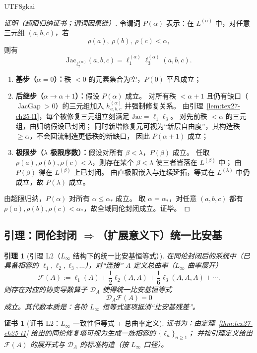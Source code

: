 \documentclass[12pt]{article}
\newtheorem{lemma}{引理}[section]
\newtheorem{Certificate}{证书}[section]
\newcommand{\JacGap}{\operatorname{JacGap}}
\begin{document}
\begin{CJK*}{UTF8}{gkai}
\begin{proof}[证明（超限归纳证书；谓词因果链）]
令谓词 $P(\alpha)$ 表示：在 $L^{(\alpha)}$ 中，对任意三元组 $(a,b,c)$，若
\[
  \rho(a),\ \rho(b),\ \rho(c)<\alpha,
\]
则有
\[
  \mathrm{Jac}_{\ell_2^{(\alpha)}}(a,b,c)=\ell_1^{(\alpha)}\ell_3^{(\alpha)}(a,b,c).
\]
\begin{enumerate}
  \item \textbf{基步（$\alpha=0$）：}秩 $<0$ 的元素集合为空，$P(0)$ 平凡成立；
  \item \textbf{后继步（$\alpha\to\alpha+1$）：}假设 $P(\alpha)$ 成立。
  对所有秩 $<\alpha+1$ 且仍有缺口（$\JacGap>0$）的三元组加入 $h_{a,b,c}^{(\alpha)}$ 并强制修复关系。
  由引理~\ref{lem:tex27-ch25-l1}，每个被修复三元组立刻满足
  $\mathrm{Jac}=\ell_1\ell_3$。
  对先前秩 $<\alpha$ 的三元组，由归纳假设已封闭；
  同时新增修复元可视为“新层自由度”，其构造秩 $\ge\alpha$，不会回流制造更低秩的新缺口，
  因此 $P(\alpha+1)$ 成立；
  \item \textbf{极限步（$\lambda$ 极限序数）：}假设对所有 $\beta<\lambda$，$P(\beta)$ 成立。
  任取 $\rho(a),\rho(b),\rho(c)<\lambda$，则存在某个 $\beta<\lambda$ 使三者皆落在 $L^{(\beta)}$ 中；
  由 $P(\beta)$ 得在 $L^{(\beta)}$ 上已封闭。
  由直极限嵌入与连续延拓，等式在 $L^{(\lambda)}$ 中仍成立，故 $P(\lambda)$ 成立。
\end{enumerate}
由超限归纳，$P(\alpha)$ 对所有 $\alpha\le\alpha_\ast$ 成立。
取 $\alpha=\alpha_\ast$，对任意 $(a,b,c)$ 都有 $\rho(a),\rho(b),\rho(c)<\alpha_\ast$，故全域同伦封闭成立。证毕。
\end{proof}

\subsection{引理：同伦封闭 \texorpdfstring{$\Rightarrow$}{=>}（扩展意义下）统一比安基}
\label{subsec:tex27-ch25-lemma2}

\begin{lemma}[引理 L2（$L_\infty$ 结构下的统一比安基恒等式）]
\label{lem:tex27-ch25-l2}
在同伦封闭后的系统中（已具备相容的 $\ell_1,\ell_2,\ell_3,\dots$），对“连接” $A$ 定义总曲率（$L_\infty$ 曲率展开）
\[
  \mathcal{F}(A)
  :=
  \ell_1(A)+\frac12\ell_2(A,A)+\frac16\ell_3(A,A,A)+\cdots.
\]
则存在对应的协变导数算子 $\mathcal{D}_A$ 使得统一比安基恒等式
\[
  \mathcal{D}_A\mathcal{F}(A)=0
\]
成立。其代数本质是：各阶 $L_\infty$ 恒等式逐项抵消“比安基残差”。
\end{lemma}

\begin{Certificate}[证书 L2：$L_\infty$ 一致性恒等式 + 总曲率定义]
\label{cert:tex27-ch25-l2}
证书为：由定理~\ref{thm:tex27-ch25-t1} 给出的同伦修复塔可视为生成一族相容的 $\{\ell_n\}_{n\ge 1}$；
并按引理定义给出 $\mathcal{F}(A)$ 的展开式与 $\mathcal{D}_A$ 的标准构造（按 $L_\infty$ 口径）。
\end{Certificate}


\end{CJK*}
\end{document}

